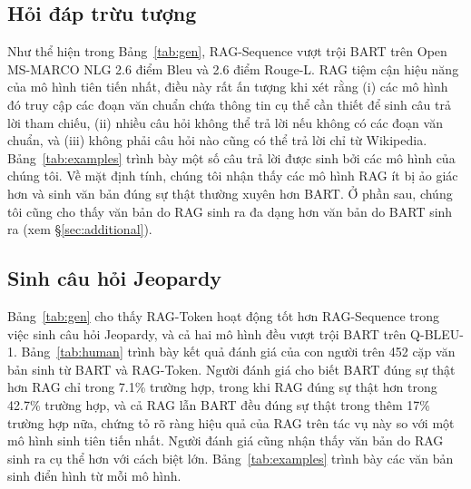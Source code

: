 \documentclass[10pt,letterpaper]{article}
\begin{document}
\subsection{Hỏi đáp trừu tượng}

Như thể hiện trong Bảng~\ref{tab:gen}, RAG-Sequence vượt trội BART trên Open
MS-MARCO NLG 2.6 điểm Bleu và 2.6 điểm Rouge-L. RAG tiệm cận hiệu năng của mô
hình tiên tiến nhất, điều này rất ấn tượng khi xét rằng (i) các mô hình đó truy
cập các đoạn văn chuẩn chứa thông tin cụ thể cần thiết để sinh câu trả lời tham
chiếu, (ii) nhiều câu hỏi không thể trả lời nếu không có các đoạn văn chuẩn, và
(iii) không phải câu hỏi nào cũng có thể trả lời chỉ từ Wikipedia.
Bảng~\ref{tab:examples} trình bày một số câu trả lời được sinh bởi các mô hình
của chúng tôi. Về mặt định tính, chúng tôi nhận thấy các mô hình RAG ít bị ảo
giác hơn và sinh văn bản đúng sự thật thường xuyên hơn BART. Ở phần sau, chúng
tôi cũng cho thấy văn bản do RAG sinh ra đa dạng hơn văn bản do BART sinh ra
(xem §\ref{sec:additional}).

\subsection{Sinh câu hỏi Jeopardy}
\label{sec:jeopardy}

Bảng~\ref{tab:gen} cho thấy RAG-Token hoạt động tốt hơn RAG-Sequence trong việc
sinh câu hỏi Jeopardy, và cả hai mô hình đều vượt trội BART trên Q-BLEU-1.
Bảng~\ref{tab:human} trình bày kết quả đánh giá của con người trên 452 cặp văn
bản sinh từ BART và RAG-Token. Người đánh giá cho biết BART đúng sự thật hơn
RAG chỉ trong 7.1\% trường hợp, trong khi RAG đúng sự thật hơn trong 42.7\%
trường hợp, và cả RAG lẫn BART đều đúng sự thật trong thêm 17\% trường hợp nữa,
chứng tỏ rõ ràng hiệu quả của RAG trên tác vụ này so với một mô hình sinh tiên
tiến nhất. Người đánh giá cũng nhận thấy văn bản do RAG sinh ra cụ thể hơn với
cách biệt lớn. Bảng~\ref{tab:examples} trình bày các văn bản sinh điển hình từ
mỗi mô hình.
\end{document}
